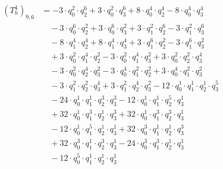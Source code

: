 \begin{align*}(T_{h}^4)_{9,6}&=-3\cdot q_0^{2}\cdot q_2^{6}+3\cdot q_0^{2}\cdot q_3^{6}+8\cdot q_0^{4}\cdot q_2^{4}-8\cdot q_0^{4}\cdot q_3^{4}\\
&\quad -3\cdot q_0^{6}\cdot q_2^{2}+3\cdot q_0^{6}\cdot q_3^{2}+3\cdot q_1^{2}\cdot q_2^{6}-3\cdot q_1^{2}\cdot q_3^{6}\\
&\quad -8\cdot q_1^{4}\cdot q_2^{4}+8\cdot q_1^{4}\cdot q_3^{4}+3\cdot q_1^{6}\cdot q_2^{2}-3\cdot q_1^{6}\cdot q_3^{2}\\
&\quad +3\cdot q_0^{2}\cdot q_1^{4}\cdot q_2^{2}-3\cdot q_0^{2}\cdot q_1^{4}\cdot q_3^{2}+3\cdot q_0^{2}\cdot q_2^{2}\cdot q_3^{4}\\
&\quad -3\cdot q_0^{2}\cdot q_2^{4}\cdot q_3^{2}-3\cdot q_0^{4}\cdot q_1^{2}\cdot q_2^{2}+3\cdot q_0^{4}\cdot q_1^{2}\cdot q_3^{2}\\
&\quad -3\cdot q_1^{2}\cdot q_2^{2}\cdot q_3^{4}+3\cdot q_1^{2}\cdot q_2^{4}\cdot q_3^{2}-12\cdot q_0^{1}\cdot q_1^{1}\cdot q_2^{1}\cdot q_3^{5}\\
&\quad -24\cdot q_0^{1}\cdot q_1^{1}\cdot q_2^{3}\cdot q_3^{3}-12\cdot q_0^{1}\cdot q_1^{1}\cdot q_2^{5}\cdot q_3^{1}\\
&\quad +32\cdot q_0^{1}\cdot q_1^{3}\cdot q_2^{1}\cdot q_3^{3}+32\cdot q_0^{1}\cdot q_1^{3}\cdot q_2^{3}\cdot q_3^{1}\\
&\quad -12\cdot q_0^{1}\cdot q_1^{5}\cdot q_2^{1}\cdot q_3^{1}+32\cdot q_0^{3}\cdot q_1^{1}\cdot q_2^{1}\cdot q_3^{3}\\
&\quad +32\cdot q_0^{3}\cdot q_1^{1}\cdot q_2^{3}\cdot q_3^{1}-24\cdot q_0^{3}\cdot q_1^{3}\cdot q_2^{1}\cdot q_3^{1}\\
&\quad -12\cdot q_0^{5}\cdot q_1^{1}\cdot q_2^{1}\cdot q_3^{1}\end{align*}
